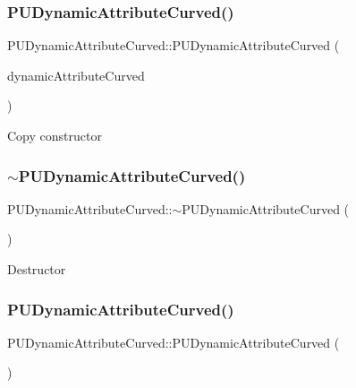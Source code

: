 \subsubsection{\texorpdfstring{P\+U\+Dynamic\+Attribute\+Curved()}{PUDynamicAttributeCurved()}\hspace{0.1cm}{\footnotesize\ttfamily [2/4]}}
{\footnotesize\ttfamily P\+U\+Dynamic\+Attribute\+Curved\+::\+P\+U\+Dynamic\+Attribute\+Curved (\begin{DoxyParamCaption}\item[{const \hyperlink{classPUDynamicAttributeCurved}{P\+U\+Dynamic\+Attribute\+Curved} \&}]{dynamic\+Attribute\+Curved }\end{DoxyParamCaption})}

Copy constructor \mbox{\label{classPUDynamicAttributeCurved_aab42c2e65980043836ec2ab691957684}} 
\subsubsection{\texorpdfstring{$\sim$\+P\+U\+Dynamic\+Attribute\+Curved()}{~PUDynamicAttributeCurved()}\hspace{0.1cm}{\footnotesize\ttfamily [1/2]}}
{\footnotesize\ttfamily P\+U\+Dynamic\+Attribute\+Curved\+::$\sim$\+P\+U\+Dynamic\+Attribute\+Curved (\begin{DoxyParamCaption}\item[{void}]{ }\end{DoxyParamCaption})}

Destructor \mbox{\label{classPUDynamicAttributeCurved_a12fc9225a908cbe9e4b0d6d18cadd7fe}} 
\subsubsection{\texorpdfstring{P\+U\+Dynamic\+Attribute\+Curved()}{PUDynamicAttributeCurved()}\hspace{0.1cm}{\footnotesize\ttfamily [3/4]}}
{\footnotesize\ttfamily P\+U\+Dynamic\+Attribute\+Curved\+::\+P\+U\+Dynamic\+Attribute\+Curved (\begin{DoxyParamCaption}\item[{void}]{ }\end{DoxyParamCaption})}

